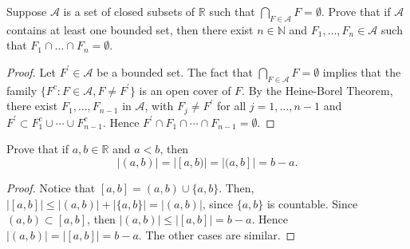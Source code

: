 \documentclass[14.5pt]{article}
\newcommand{\N}{\mathbb{N}}
\newcommand{\R}{\mathbb{R}}
\newenvironment{problem}[2][Problem]{\begin{mdframed}[backgroundcolor=gray!10, leftline = false, rightline=false, linewidth=0.25pt]  \begin{trivlist}
\item[\hskip \labelsep {\bfseries #1}\hskip \labelsep {\bfseries #2.}]}{\end{trivlist} \end{mdframed}  }
\begin{document}
\begin{problem}{2A.5}
    Suppose $\mathcal A $ is a set of closed subsets of $\R$ such that $\bigcap_{F \in \mathcal A} F = \emptyset$. Prove that if $\mathcal A$ contains at least one bounded set, then there exist $n \in \N$ and $F_1, \ldots, F_n \in \mathcal{A}$ such that $F_1 \cap \ldots \cap F_n = \emptyset.$
\end{problem}
\begin{proof}
    Let $F^\prime \in \mathcal{A}$ be a bounded set. The fact that  $\bigcap_{F \in \mathcal A} F = \emptyset$  implies that the family $\{F^c: F \in \mathcal A, F \neq F^\prime\}$ is an open cover of $F$. By the Heine-Borel Theorem, there exist $F_1, \ldots, F_{n-1}$ in $\mathcal{A}$, with $F_j \neq F^\prime$ for all $j =1, \ldots, n-1$ and
    $F^\prime \subset F_1^c \cup \cdots \cup F_{n-1}^c.$ Hence 
    $F^\prime \cap F_1 \cap \cdots \cap F_{n-1} = \emptyset.$
\end{proof}

\begin{problem}{2A.6} Prove that if $a, b \in \R$ and $a < b$, then
$$|(a,b)| = |[a,b)| = |(a, b]| = b - a.$$
\end{problem}
\begin{proof}
    Notice that $[a,b] = (a, b) \cup \{a, b\}$. Then, $|[a,b]| \leq |(a,b)| + |\{a,b\}| = |(a,b)|$, since $\{a,b\}$ is countable. Since $(a,b) \subset [a,b]$, then $|(a,b)| \leq |[a,b]| = b - a.$ Hence $|(a,b)| = |[a,b]| = b - a.$ The other cases are similar. 
\end{proof}
\end{document}
